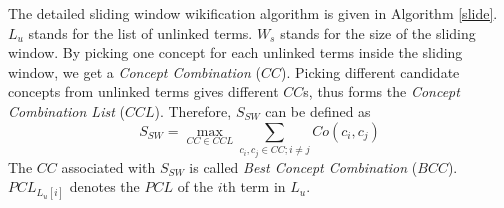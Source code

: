 The detailed sliding window wikification algorithm is given in Algorithm
\ref{slide}. $L_u$ stands for the list of unlinked terms. $W_s$ stands for the
size of the sliding window. By picking one concept for each unlinked terms inside
the sliding window, we get a \emph{Concept Combination} ($CC$). 
Picking different candidate concepts from unlinked terms 
gives different $CC$s, thus forms the \emph{Concept Combination List} ($CCL$).
Therefore, $S_{SW}$ can be defined as
\[
S_{SW}=\max_{CC\in CCL}\sum_{c_i,c_j\in CC;i\neq j}{Co\left(c_i,c_j\right)}
\]
The $CC$ associated with $S_{SW}$ is called \emph{Best Concept Combination} ($BCC$).
$PCL_{L_u[i]}$ denotes the $PCL$ of the $i$th term in $L_u$.
%
%
%
%
%

